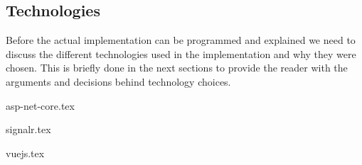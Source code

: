 \documentclass{article}
\begin{document}
\subsection{Technologies}
Before the actual implementation can be programmed and explained we need to discuss the different technologies used in the implementation and why they were chosen. This is briefly done in the next sections to provide the reader with the arguments and decisions behind technology choices.

{asp-net-core.tex}

{signalr.tex}

{vuejs.tex}
\end{document}
